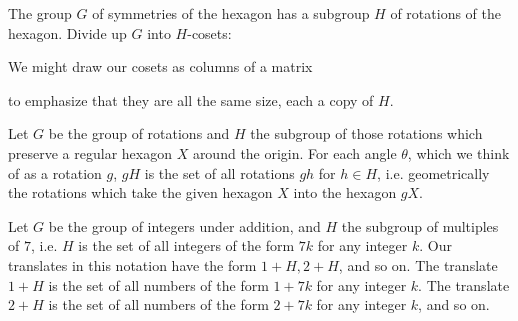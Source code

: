 \begin{example}
The group \(G\) of symmetries of the hexagon has a subgroup \(H\) of rotations of the hexagon.
Divide up \(G\) into \(H\)-cosets:
\begin{center}

\end{center}
\end{example}
\begin{example}
We might draw our cosets as columns of a matrix
\begin{center}

\end{center}
to emphasize that they are all the same size, each a copy of \(H\).
\end{example}
\begin{example}
Let \(G\) be the group of rotations and \(H\) the subgroup of those rotations which preserve a regular hexagon \(X\) around the origin.
For each angle \(\theta\), which we think of as a rotation \(g\), \(gH\) is the set of all rotations \(gh\) for \(h \in H\), i.e. geometrically the rotations which take the given hexagon \(X\) into the hexagon \(gX\).
\end{example}
\begin{example}
Let \(G\) be the group of integers under addition, and \(H\) the subgroup of multiples of \(7\), i.e. \(H\) is the set of all integers of the form \(7k\) for any integer \(k\).
Our translates in this notation have the form \(1+H, 2+H\), and so on.
The translate \(1+H\) is the set of all numbers of the form \(1+7k\) for any integer \(k\).
The translate \(2+H\) is the set of all numbers of the form \(2+7k\) for any integer \(k\), and so on.
\end{example}

